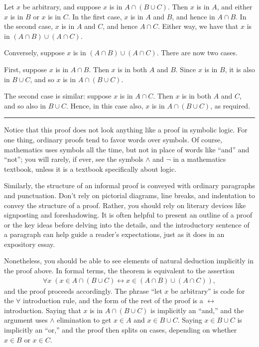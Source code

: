 \documentclass[letterpaper,10pt,english]{sphinxmanual}
\begin{document}
\sphinxAtStartPar
{} Let \(x\) be arbitrary, and suppose \(x\) is in \(A \cap (B \cup C)\). Then \(x\) is in \(A\), and either \(x\) is in \(B\) or \(x\) is in \(C\). In the first case, \(x\) is in \(A\) and \(B\), and hence in \(A \cap B\). In the second case, \(x\) is in \(A\) and \(C\), and hence \(A \cap C\). Either way, we have that \(x\) is in \((A \cap B) \cup (A \cap C)\).

\sphinxAtStartPar
Conversely, suppose \(x\) is in \((A \cap B) \cup (A \cap C)\). There are now two cases.

\sphinxAtStartPar
First, suppose \(x\) is in \(A \cap B\). Then \(x\) is in both \(A\) and \(B\). Since \(x\) is in \(B\), it is also in \(B \cup C\), and so \(x\) is in \(A \cap (B \cup C)\).

\sphinxAtStartPar
The second case is similar: suppose \(x\) is in \(A \cap C\). Then \(x\) is in both \(A\) and \(C\), and so also in \(B \cup C\). Hence, in this case also, \(x\) is in \(A \cap (B \cup C)\), as required.


\bigskip\hrule\bigskip


\sphinxAtStartPar
Notice that this proof does not look anything like a proof in symbolic logic. For one thing, ordinary proofs tend to favor words over symbols. Of course, mathematics uses symbols all the time, but not in place of words like “and” and “not”; you will rarely, if ever, see the symbols \(\wedge\) and \(\neg\) in a mathematics textbook, unless it is a textbook specifically about logic.

\sphinxAtStartPar
Similarly, the structure of an informal proof is conveyed with ordinary paragraphs and punctuation. Don’t rely on pictorial diagrams, line breaks, and indentation to convey the structure of a proof. Rather, you should rely on literary devices like signposting and foreshadowing. It is often helpful to present an outline of a proof or the key ideas before delving into the details, and the introductory sentence of a paragraph can help guide a reader’s expectations, just as it does in an expository essay.

\sphinxAtStartPar
Nonetheless, you should be able to see elements of natural deduction implicitly in the proof above. In formal terms, the theorem is equivalent to the assertion
\begin{equation*}
\begin{split}\forall x \; (x \in A \cap (B \cup C) \leftrightarrow  x \in (A \cap B) \cup (A \cap C)),\end{split}
\end{equation*}
\sphinxAtStartPar
and the proof proceeds accordingly. The phrase “let \(x\) be arbitrary” is code for the \(\forall\) introduction rule, and the form of the rest of the proof is a \(\leftrightarrow\) introduction. Saying that \(x\) is in \(A \cap (B \cup C)\) is implicitly an “and,” and the argument uses \(\wedge\) elimination to get \(x \in A\) and \(x \in B \cup C\). Saying \(x \in B \cup C\) is implicitly an “or,” and the proof then splits on cases, depending on whether \(x \in B\) or \(x \in C\).
\end{document}
